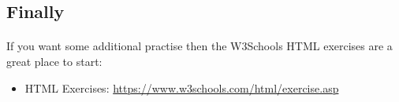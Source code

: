 \documentclass[10pt, a4paper, twosize]{article}
\begin{document}
\subsection{Finally}
\paragraph{} If you want some additional practise then the W3Schools HTML exercises are a great place to start:

\begin{itemize}
\item HTML Exercises: \url{https://www.w3schools.com/html/exercise.asp}
\end{itemize}





%

%
\end{document}
